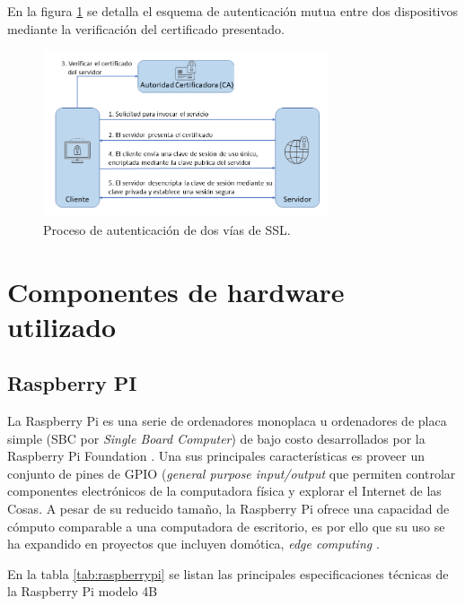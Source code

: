 En la figura \ref{fig:ssl2way} se detalla el esquema de autenticación mutua entre dos dispositivos mediante la verificación del certificado presentado.

\begin{figure}[h]
	\centering
	\includegraphics[width=0.75\textwidth]{./Figures/tls.png}
	\caption[Proceso de autenticación de dos vías de SSL.]{Proceso de autenticación de dos vías de SSL\protect\footnotemark.}
	\label{fig:ssl2way}

\end{figure}
	
\section{Componentes de hardware utilizado}
\label{sec:Hardware utilizado}

\subsection{Raspberry PI}
\label{sec:Raspberry PI}
La Raspberry Pi es una serie de ordenadores monoplaca u ordenadores de placa simple (SBC por \textit{Single Board Computer}) de bajo costo desarrollados por la Raspberry Pi Foundation \citep{raspberrypi:1}.
Una sus principales características es proveer un conjunto de pines de GPIO (\textit{general purpose input/output} que permiten controlar componentes electrónicos de la computadora física y explorar el Internet de las Cosas.
A pesar de su reducido tamaño, la Raspberry Pi ofrece una capacidad de cómputo comparable a una computadora de escritorio, es por ello que su uso se ha expandido en proyectos que incluyen domótica, \textit{edge computing} \citep{raspberrypi:2}. 

En la tabla \ref{tab:raspberrypi} se listan las principales especificaciones técnicas de la Raspberry Pi modelo 4B
 
